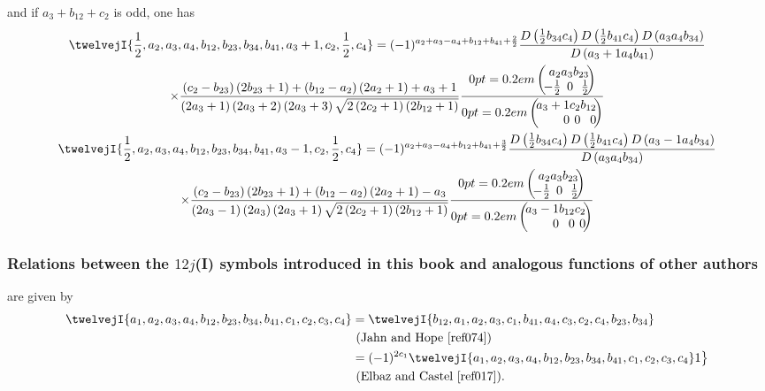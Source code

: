 and if $a_{3}+b_{12}+c_{2}$ is odd, one has
\begin{gather}
\twelvejI{\frac{1}{2},a_{2},a_{3},a_{4},b_{12},b_{23},b_{34},b_{41},a_{3}+1,c_{2},\frac{1}{2},c_{4}}=(-1)^{a_{2}+a_{3}-a_{4}+b_{12}+b_{41}+\frac{2}{2}} \frac{D\left(\frac{1}{2} b_{34} c_{4}\right) D\left(\frac{1}{2} b_{41} c_{4}\right) D\left(a_{3} a_{4} b_{34}\right)}{D\left(a_{3}+1 a_{4} b_{41}\right)}  \notag\\
\times \frac{\left(c_{2}-b_{23}\right)\left(2 b_{23}+1\right)+\left(b_{12}-a_{2}\right)\left(2 a_{2}+1\right)+a_{3}+1}{\left(2 a_{3}+1\right)\left(2 a_{3}+2\right)\left(2 a_{3}+3\right) \sqrt{2\left(2 c_{2}+1\right)\left(2 b_{12}+1\right)}} \frac{\threej{a_{2} }{ a_{3} }{ b_{23} }{-\frac{1}{2} }{ 0 }{ \frac{1}{2}}}{\threej{a_{3}+1 }{ c_{2} }{ b_{12} }{0 }{ 0 }{ 0}}  \label{eq:10:13:22}\\
\twelvejI{\frac{1}{2},a_{2},a_{3},a_{4},b_{12},b_{23},b_{34},b_{41},a_{3}-1,c_{2},\frac{1}{2},c_{4}}=(-1)^{a_{2}+a_{3}-a_{4}+b_{12}+b_{41}+\frac{3}{2}} \frac{D\left(\frac{1}{2} b_{34} c_{4}\right) D\left(\frac{1}{2} b_{41} c_{4}\right) D\left(a_{3}-1 a_{4} b_{34}\right)}{D\left(a_{3} a_{4} b_{34}\right)}  \notag\\
\times \frac{\left(c_{2}-b_{23}\right)\left(2 b_{23}+1\right)+\left(b_{12}-a_{2}\right)\left(2 a_{2}+1\right)-a_{3}}{\left(2 a_{3}-1\right)\left(2 a_{3}\right)\left(2 a_{3}+1\right) \sqrt{2\left(2 c_{2}+1\right)\left(2 b_{12}+1\right)}} \frac{\threej{a_{2} }{ a_{3} }{ b_{23} }{-\frac{1}{2} }{ 0 }{ \frac{1}{2}}}{\threej{a_{3}-1 }{ b_{12} }{ c_{2} }{0 }{ 0 }{ 0}} \label{eq:10:13:23}
\end{gather}
\subsubsection{Relations between the $12j$(I) symbols introduced in this book and analogous functions of other authors}
are given by
\[
\begin{aligned}
\twelvejI{a_{1},a_{2},a_{3},a_{4},b_{12},b_{23},b_{34},b_{41},c_{1},c_{2},c_{3},c_{4}} & =\twelvejI{b_{12},a_{1},a_{2},a_{3},c_{1},b_{41},a_{4},c_{3},c_{2},c_{4},b_{23},b_{34}} \\
& \text { (Jahn and Hope \cite{ref074})} \\
& \left.=(-1)^{2 c_{1}}\twelvejI{a_{1},a_{2},a_{3},a_{4},b_{12},b_{23},b_{34},b_{41},c_{1},c_{2},c_{3},c_{4}} 1\right\} \\
& \text { (Elbaz and Castel \cite{ref017}). }
\end{aligned}
\]

